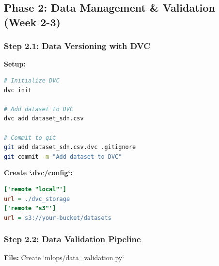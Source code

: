 \documentclass[12pt]{article}
\begin{document}
\subsection{Phase 2: Data Management \& Validation (Week 2-3)}

\subsubsection{Step 2.1: Data Versioning with DVC}

\textbf{Setup:}
\begin{lstlisting}[language=bash]
# Initialize DVC
dvc init

# Add dataset to DVC
dvc add dataset_sdn.csv

# Commit to git
git add dataset_sdn.csv.dvc .gitignore
git commit -m "Add dataset to DVC"
\end{lstlisting}

\textbf{Create `.dvc/config`:}
\begin{lstlisting}[language=ini]
['remote "local"']
url = ./dvc_storage
['remote "s3"']
url = s3://your-bucket/datasets
\end{lstlisting}

\subsubsection{Step 2.2: Data Validation Pipeline}

\textbf{File:} Create `mlops/data_validation.py`
\end{document}
